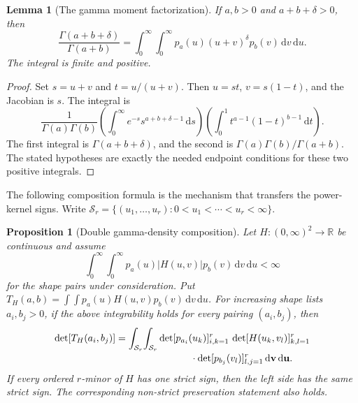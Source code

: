 \documentclass[11pt,a4paper]{article}
\newtheorem{lemma}[theorem]{Lemma}
\newtheorem{proposition}[theorem]{Proposition}
\theoremstyle{definition}
\theoremstyle{remark}
\newcommand{\R}{\mathbb R}
\newcommand{\dd}{\,\mathrm d}
\newcommand{\simplex}[1]{\mathcal S_{#1}}
\begin{document}
\begin{lemma}[The gamma moment factorization]\label{lem:moment}
If \(a,b>0\) and \(a+b+\delta>0\), then
\begin{equation}\label{eq:mixture}
 \frac{\Gamma(a+b+\delta)}{\Gamma(a+b)}
 =\int_0^\infty\!\int_0^\infty
 p_a(u)(u+v)^\delta p_b(v)\dd v\dd u.
\end{equation}
The integral is finite and positive.
\end{lemma}
\begin{proof}
Set \(s=u+v\) and \(t=u/(u+v)\). Then
\(u=st\), \(v=s(1-t)\), and the Jacobian is \(s\). The integral is
\[
 \frac{1}{\Gamma(a)\Gamma(b)}
 \left(\int_0^\infty e^{-s}s^{a+b+\delta-1}\dd s\right)
 \left(\int_0^1 t^{a-1}(1-t)^{b-1}\dd t\right).
\]
The first integral is \(\Gamma(a+b+\delta)\), and the second is
\(\Gamma(a)\Gamma(b)/\Gamma(a+b)\). The stated hypotheses are
exactly the needed endpoint conditions for these two positive integrals.
\end{proof}

The following composition formula is the mechanism that transfers the
power-kernel signs. Write
\(\simplex r=\{(u_1,\ldots,u_r):0<u_1<\cdots<u_r<\infty\}\).

\begin{proposition}[Double gamma-density composition]\label{prop:composition}
Let \(H:(0,\infty)^2\to\R\) be continuous and assume
\[
 \int_0^\infty\!\int_0^\infty
 p_a(u)|H(u,v)|p_b(v)\dd v\dd u<\infty
\]
for the shape pairs under consideration. Put
\(T_H(a,b)=\int\!\int p_a(u)H(u,v)p_b(v)\dd v\dd u\).
For increasing shape lists \(a_i,b_j>0\), if the above integrability
holds for every pairing \((a_i,b_j)\), then
\begin{align}\label{eq:double-composition}
 \det[T_H(a_i,b_j)]
 &=\int_{\simplex r}\!\int_{\simplex r}
 \det[p_{a_i}(u_k)]_{i,k=1}^{r}\,
 \det[H(u_k,v_l)]_{k,l=1}^{r}\notag\\[-0.2em]
 &\hspace{27mm}\cdot
 \det[p_{b_j}(v_l)]_{l,j=1}^{r}
 \dd\mathbf v\dd\mathbf u.
\end{align}
If every ordered \(r\)-minor of \(H\) has one strict sign, then the
left side has the same strict sign. The corresponding non-strict
preservation statement also holds.
\end{proposition}
\end{document}
